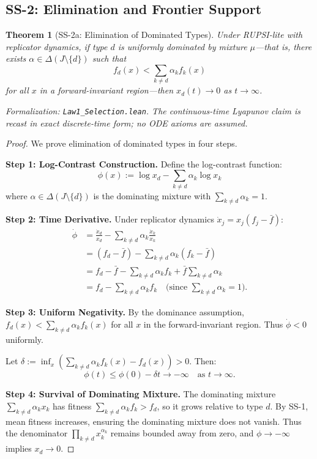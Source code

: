 \documentclass[12pt]{article}
\newtheorem{theorem}{Theorem}[section]
\begin{document}
\subsection{SS-2: Elimination and Frontier Support}

\begin{theorem}[SS-2a: Elimination of Dominated Types]
\label{thm:ss2a}
Under RUPSI-lite with replicator dynamics, if type $d$ is uniformly dominated by mixture $\mu$---that is, there exists $\alpha \in \Delta(J \setminus \{d\})$ such that
\[
f_d(x) < \sum_{k \neq d} \alpha_k f_k(x)
\]
for all $x$ in a forward-invariant region---then $x_d(t) \to 0$ as $t \to \infty$.
\end{theorem}
\noindent\textit{Formalization: \texttt{Law1\_Selection.lean}. The continuous-time Lyapunov claim is recast in exact discrete-time form; no ODE axioms are assumed.}

\begin{proof}
We prove elimination of dominated types in four steps.

\textbf{Step 1: Log-Contrast Construction.}
Define the log-contrast function:
\[
\phi(x) := \log x_d - \sum_{k \neq d} \alpha_k \log x_k
\]
where $\alpha \in \Delta(J \setminus \{d\})$ is the dominating mixture with $\sum_{k \neq d} \alpha_k = 1$.

\textbf{Step 2: Time Derivative.}
Under replicator dynamics $\dot{x}_j = x_j(f_j - \bar{f})$:
\begin{align*}
\dot{\phi} &= \frac{\dot{x}_d}{x_d} - \sum_{k \neq d} \alpha_k \frac{\dot{x}_k}{x_k} \\
&= (f_d - \bar{f}) - \sum_{k \neq d} \alpha_k (f_k - \bar{f}) \\
&= f_d - \bar{f} - \sum_{k \neq d} \alpha_k f_k + \bar{f} \sum_{k \neq d} \alpha_k \\
&= f_d - \sum_{k \neq d} \alpha_k f_k \quad \text{(since $\sum_{k \neq d} \alpha_k = 1$)}.
\end{align*}

\textbf{Step 3: Uniform Negativity.}
By the dominance assumption, $f_d(x) < \sum_{k \neq d} \alpha_k f_k(x)$ for all $x$ in the forward-invariant region. Thus $\dot{\phi} < 0$ uniformly.

Let $\delta := \inf_x \left( \sum_{k \neq d} \alpha_k f_k(x) - f_d(x) \right) > 0$. Then:
\[
\phi(t) \leq \phi(0) - \delta t \to -\infty \quad \text{as } t \to \infty.
\]

\textbf{Step 4: Survival of Dominating Mixture.}
The dominating mixture $\sum_{k \neq d} \alpha_k x_k$ has fitness $\sum_{k \neq d} \alpha_k f_k > f_d$, so it grows relative to type $d$. By SS-1, mean fitness increases, ensuring the dominating mixture does not vanish. Thus the denominator $\prod_{k \neq d} x_k^{\alpha_k}$ remains bounded away from zero, and $\phi \to -\infty$ implies $x_d \to 0$.
\end{proof}
\end{document}

